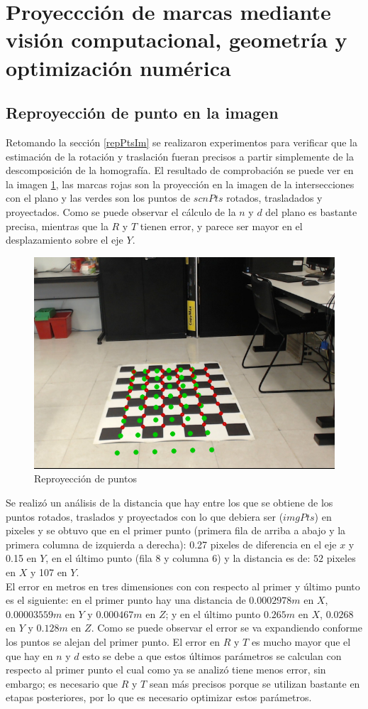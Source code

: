 \section{Proyeccción de marcas mediante visión computacional, geometría y optimización numérica}
\subsection{Reproyección de punto en la imagen}
	Retomando la sección \ref{repPtsIm} se realizaron experimentos para verificar que la estimación de la rotación y traslación fueran precisos a partir simplemente de la descomposición de la homografía.	El resultado de comprobación se puede ver en la imagen \ref{fig: figRepPtsIm}, las marcas rojas son la proyección en la imagen de la intersecciones con el plano y las verdes son los puntos de $scnPts$ rotados, trasladados y proyectados. Como se puede observar el cálculo de la $n$ y $d$ del plano es bastante precisa, mientras que la $R$ y $T$ tienen error, y parece ser mayor en el desplazamiento sobre el eje $Y$. 
	\begin{figure}[htbp]
		\centering
		\includegraphics[width=.5\textwidth]{./pictures/rep}
		\caption{Reproyección de puntos} \label{fig: figRepPtsIm}
	\end{figure}
	
	Se realizó un análisis de la distancia que hay entre los que se obtiene de los puntos rotados, traslados y proyectados con lo que debiera ser ($imgPts$) en pixeles y se obtuvo que en el primer punto (primera fila de arriba a abajo y la primera columna de izquierda a derecha): 0.27 pixeles de diferencia en el eje $x$ y 0.15 en $Y$, en el último punto (fila 8 y columna 6) y la distancia es de: $52$ pixeles en $X$ y 107 en $Y$.\\
	El error en metros en tres dimensiones con con respecto al primer y último punto es el siguiente: en el primer punto hay una distancia de $0.0002978m$ en $X$, $0.00003559m$ en $Y$ y $0.000467m$ en $Z$; y en el último punto $0.265m$ en $X$, $0.0268$ en $Y$ y $0.128m$ en $Z$. Como se puede observar el error se va expandiendo conforme los puntos se alejan del primer punto. El error en $R$ y $T$ es mucho mayor que el que hay en $n$ y $d$ esto se debe a que estos últimos parámetros se calculan con respecto al primer punto el cual como ya se analizó tiene menos error, sin embargo; es necesario que $R$ y $T$ sean más precisos porque se utilizan bastante en etapas posteriores, por lo que es necesario optimizar estos parámetros.
	
